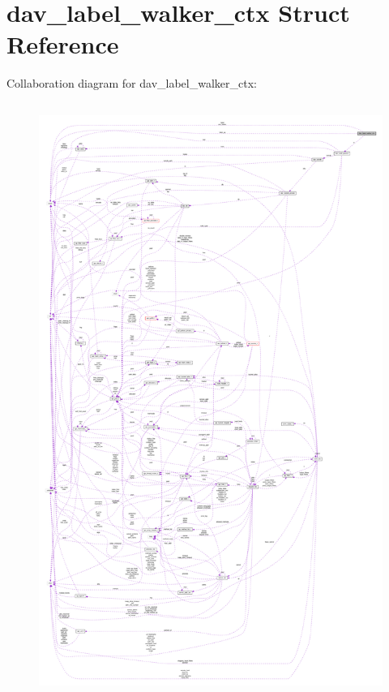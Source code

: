 \hypertarget{structdav__label__walker__ctx}{}\section{dav\+\_\+label\+\_\+walker\+\_\+ctx Struct Reference}
\label{structdav__label__walker__ctx}


Collaboration diagram for dav\+\_\+label\+\_\+walker\+\_\+ctx\+:
\nopagebreak
\begin{figure}[H]
\begin{center}
\leavevmode
\includegraphics[height=550pt]{structdav__label__walker__ctx__coll__graph}
\end{center}
\end{figure}
